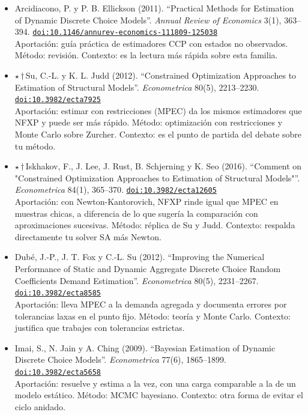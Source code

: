 \documentclass[11pt]{article}
\begin{document}
\begin{itemize}
Aportación: aproxima la solución con integración Monte Carlo en un subconjunto de estados e interpolación. Método: numérico. Contexto: es la opción cuando el espacio de estados no cabe en memoria.
\item Arcidiacono, P. y P. B. Ellickson (2011). ``Practical Methods for Estimation of Dynamic Discrete Choice Models''. \textit{Annual Review of Economics} 3(1), 363--394. \href{https://doi.org/10.1146/annurev-economics-111809-125038}{\texttt{doi:10.1146/annurev-economics-111809-125038}}\\
Aportación: guía práctica de estimadores CCP con estados no observados. Método: revisión. Contexto: es la lectura más rápida sobre esta familia.
\item $\star$\,$\dagger$\,Su, C.-L. y K. L. Judd (2012). ``Constrained Optimization Approaches to Estimation of Structural Models''. \textit{Econometrica} 80(5), 2213--2230. \href{https://doi.org/10.3982/ecta7925}{\texttt{doi:10.3982/ecta7925}}\\
Aportación: estimar con restricciones (MPEC) da los mismos estimadores que NFXP y puede ser más rápido. Método: optimización con restricciones y Monte Carlo sobre Zurcher. Contexto: es el punto de partida del debate sobre tu método.
\item $\star$\,$\dagger$\,Iskhakov, F., J. Lee, J. Rust, B. Schjerning y K. Seo (2016). ``Comment on "Constrained Optimization Approaches to Estimation of Structural Models"''. \textit{Econometrica} 84(1), 365--370. \href{https://doi.org/10.3982/ecta12605}{\texttt{doi:10.3982/ecta12605}}\\
Aportación: con Newton-Kantorovich, NFXP rinde igual que MPEC en muestras chicas, a diferencia de lo que sugería la comparación con aproximaciones sucesivas. Método: réplica de Su y Judd. Contexto: respalda directamente tu solver SA más Newton.
\item Dubé, J.-P., J. T. Fox y C.-L. Su (2012). ``Improving the Numerical Performance of Static and Dynamic Aggregate Discrete Choice Random Coefficients Demand Estimation''. \textit{Econometrica} 80(5), 2231--2267. \href{https://doi.org/10.3982/ecta8585}{\texttt{doi:10.3982/ecta8585}}\\
Aportación: lleva MPEC a la demanda agregada y documenta errores por tolerancias laxas en el punto fijo. Método: teoría y Monte Carlo. Contexto: justifica que trabajes con tolerancias estrictas.
\item Imai, S., N. Jain y A. Ching (2009). ``Bayesian Estimation of Dynamic Discrete Choice Models''. \textit{Econometrica} 77(6), 1865--1899. \href{https://doi.org/10.3982/ecta5658}{\texttt{doi:10.3982/ecta5658}}\\
Aportación: resuelve y estima a la vez, con una carga comparable a la de un modelo estático. Método: MCMC bayesiano. Contexto: otra forma de evitar el ciclo anidado.
\end{itemize}
\end{document}
